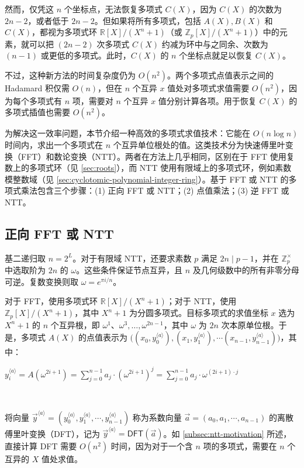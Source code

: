 然而，仅凭这 $n$ 个坐标点，无法恢复多项式 $C(X)$，因为 $C(X)$ 的次数为 $2n-2$，或者低于 $2n-2$。但如果将所有多项式，包括 $A(X), B(X)$ 和 $C(X)$，都视为多项式环 $\mathbb{R}[X]/ (X^n + 1)$（或 $\mathbb{Z}_p[X]/(X^n + 1)$）中的元素，就可以把 $(2n-2)$ 次多项式 $C(X)$ 约减为环中与之同余、次数为 $(n-1)$ 或更低的多项式。此时，$C(X)$ 的 $n$ 个坐标点就足以恢复 $C(X)$。

不过，这种新方法的时间复杂度仍为 $O(n^2)$。两个多项式点值表示之间的 Hadamard 积仅需 $O(n)$，但在 $n$ 个互异 $x$ 值处对多项式求值需要 $O(n^2)$，因为每个多项式有 $n$ 项，需要对 $n$ 个互异 $x$ 值分别计算各项。用于恢复 $C(X)$ 的多项式插值也需要 $O(n^2)$。

为解决这一效率问题，本节介绍一种高效的多项式求值技术：它能在 $O(n \log n)$ 时间内，求出一个多项式在 $n$ 个互异单位根处的值。这类技术分为快速傅里叶变换（FFT）和数论变换（NTT）。两者在方法上几乎相同，区别在于 FFT 使用复数上的多项式环（见 \autoref{sec:roots}），而 NTT 使用有限域上的多项式环，例如素数模整数域（见 \autoref{sec:cyclotomic-polynomial-integer-ring}）。基于 FFT 或 NTT 的多项式乘法包含三个步骤：(1) 正向 FFT 或 NTT；(2) 点值乘法；(3) 逆 FFT 或 NTT。

\subsection{正向 FFT 或 NTT}
\label{subsec:ntt-forward}

基二递归取 $n=2^L$。对于有限域 NTT，还要求素数 $p$ 满足 $2n\mid p-1$，并在 $\mathbb Z_p^\times$ 中选取阶为 $2n$ 的 $\omega$。这些条件保证节点互异，且 $n$ 及几何级数中的所有非零分母可逆。复数变换则取 $\omega=e^{\pi i/n}$。

对于 FFT，使用多项式环 $\mathbb{R}[X]/ (X^n + 1)$；对于 NTT，使用 $\mathbb{Z}_p[X]/ (X^n + 1)$，其中 $X^n + 1$ 为分圆多项式。目标多项式的求值坐标 $x$ 选为 $X^n + 1$ 的 $n$ 个互异根，即 $\omega^1$、$\omega^3, \ldots, \omega^{2n-1}$，其中 $\omega$ 为 $2n$ 次本原单位根。于是，多项式 $A(X)$ 的点值表示为 $\bm ( ({x}_0, {y}_0^{\langle a \rangle}), ({x}_1, {y}_1^{\langle a \rangle}), \cdots ({x}_{n-1}, {y}_{n-1}^{\langle a \rangle}) \bm )$，其中：

${y}_i^{\langle a \rangle} = A(\omega^{2i + 1}) = \sum\limits_{j=0}^{n-1}a_{j}\cdot (\omega^{2i + 1})^j = \sum\limits_{j=0}^{n-1}a_{j}\cdot \omega^{(2i + 1)\cdot j}$

$ $

将向量 $\vec{y}^{\langle a \rangle} = (y_0^{\langle a \rangle}, y_1^{\langle a \rangle}, \cdots, y_{n-1}^{\langle a \rangle})$ 称为系数向量 $\vec{a} = (a_0, a_1, \cdots, a_{n-1})$ 的离散傅里叶变换（DFT），记为 $\vec{y}^{\langle a \rangle} = \textsf{DFT}(\vec{a})$。如 \autoref{subsec:ntt-motivation} 所述，直接计算 DFT 需要 $O(n^2)$ 时间，因为对于一个含 $n$ 项的多项式，需要在 $n$ 个互异的 $X$ 值处求值。

